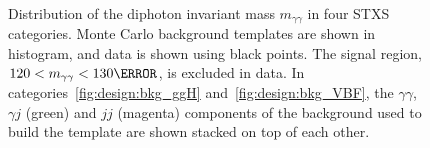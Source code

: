 \begin{figure}[!htbp]
\centering
{}
    \\
\caption{Distribution of the diphoton invariant mass $m_{\gamma \gamma}$ in four STXS categories. Monte Carlo background templates are shown in histogram, and data is shown using black points. The signal region, $120 < m_{\gamma \gamma} < 130 \GeV$, is excluded in data. In categories~\ref{fig:design:bkg_ggH} and~\ref{fig:design:bkg_VBF}, the $\gamma \gamma$, $\gamma j$ (green) and $jj$ (magenta) components of the background used to build the template are shown stacked on top of each other. }
\label{fig:design:bkg}
\end{figure}

